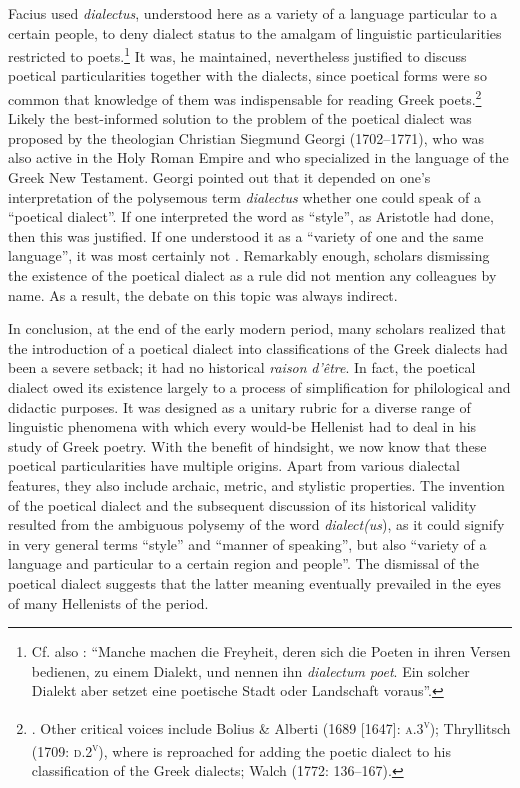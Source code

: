 \documentclass[output=paper]{langsci/langscibook}
\begin{document}
Facius used \textit{dialectus}, understood here as a variety of a language particular to a certain people, to deny dialect status to the amalgam of linguistic particularities restricted to poets.\footnote{Cf. also \citet[67]{Haas1780}: “Manche machen die Freyheit, deren sich die Poeten in ihren Versen bedienen, zu einem Dialekt, und nennen ihn \textit{dialectum} \textit{poet}. Ein solcher Dialekt aber setzet eine poetische Stadt oder Landschaft voraus”.} It was, he maintained, nevertheless justified to discuss poetical particularities together with the dialects, since poetical forms were so common that knowledge of them was indispensable for reading Greek poets.\footnote{\citet[98]{Facius1782}. Other critical voices include Bolius \& Alberti (1689 [1647]: \textsc{a.3}\textsc{\textsuperscript{v}}); Thryllitsch (1709: \textsc{d.2}\textsc{\textsuperscript{v}}), where \citet[147]{Reyher1634} is reproached for adding the poetic dialect to his classification of the Greek dialects; Walch (1772: 136–167).} Likely the best-informed solution to the problem of the poetical dialect was proposed by the theologian Christian Siegmund Georgi (1702–1771), who was also active in the Holy Roman Empire and who specialized in the language of the Greek New Testament. Georgi pointed out that it depended on one’s interpretation of the polysemous term \textit{dialectus} whether one could speak of a “poetical dialect”. If one interpreted the word as “style”, as Aristotle had done, then this was justified. If one understood it as a “variety of one and the same language”, it was most certainly not \citep[169]{Georgi1733}. Remarkably enough, scholars dismissing the existence of the poetical dialect as a rule did not mention any colleagues by name. As a result, the debate on this topic was always indirect.

In conclusion, at the end of the early modern period, many scholars realized that the introduction of a poetical dialect into classifications of the Greek dialects had been a severe setback; it had no historical \textit{raison} \textit{d’être}. In fact, the poetical dialect owed its existence largely to a process of simplification for philological and didactic purposes. It was designed as a unitary rubric for a diverse range of linguistic phenomena with which every would-be Hellenist had to deal in his study of Greek poetry. With the benefit of hindsight, we now know that these poetical particularities have multiple origins. Apart from various dialectal features, they also include archaic, metric, and stylistic properties. The invention of the poetical dialect and the subsequent discussion of its historical validity resulted from the ambiguous polysemy of the word \textit{dialect(us}), as it could signify in very general terms “style” and “manner of speaking”, but also “variety of a language and particular to a certain region and people”. The dismissal of the poetical dialect suggests that the latter meaning eventually prevailed in the eyes of many Hellenists of the period.
\end{document}
